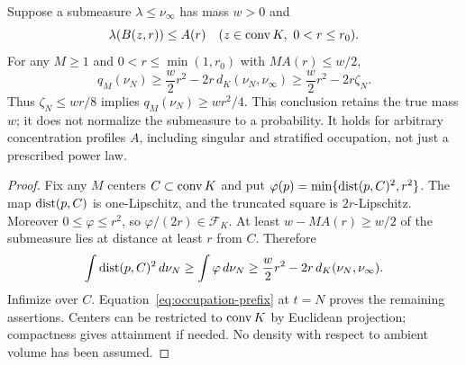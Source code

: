 \begin{theorem}\label{thm:resolution}
Suppose a submeasure $\lambda\le\nu_\infty$ has mass $w>0$ and
\[
 \lambda(B(z,r))\le A(r)
 \quad(z\in\operatorname{conv} K,
       \ 0<r\le r_0).
\]
For any $M\ge1$ and $0<r\le\min(1,r_0)$ with $M A(r)\le w/2$,
\begin{equation}\label{eq:local-mass}
 q_M(\nu_N)\ge\frac w2r^2-2r\,d_K(\nu_N,\nu_\infty)
              \ge\frac w2r^2-2r\zeta_N.
\end{equation}
Thus $\zeta_N\le wr/8$ implies $q_M(\nu_N)\ge wr^2/4$. This conclusion retains the true mass $w$; it does not normalize the submeasure to a probability. It holds for arbitrary concentration profiles $A$, including singular and stratified occupation, not just a prescribed power law.
\end{theorem}
\begin{proof}
Fix any $M$ centers $C\subset\operatorname{conv} K$ and put
$\varphi(p)=\min\{\operatorname{dist}(p,C)^2,r^2\}$. The map $\operatorname{dist}(p,C)$ is one-Lipschitz, and the truncated square is $2r$-Lipschitz. Moreover $0\le\varphi\le r^2$, so $\varphi/(2r)\in\mathcal F_K$. At least $w-MA(r)\ge w/2$ of the submeasure lies at distance at least $r$ from $C$. Therefore
\[
 \int\operatorname{dist}(p,C)^2\,d\nu_N
 \ge\int\varphi\,d\nu_N
 \ge\frac w2r^2-2r\,d_K(\nu_N,\nu_\infty).
\]
Infimize over $C$. Equation~\eqref{eq:occupation-prefix} at $t=N$ proves the remaining assertions. Centers can be restricted to $\operatorname{conv} K$ by Euclidean projection; compactness gives attainment if needed. No density with respect to ambient volume has been assumed.
\end{proof}

